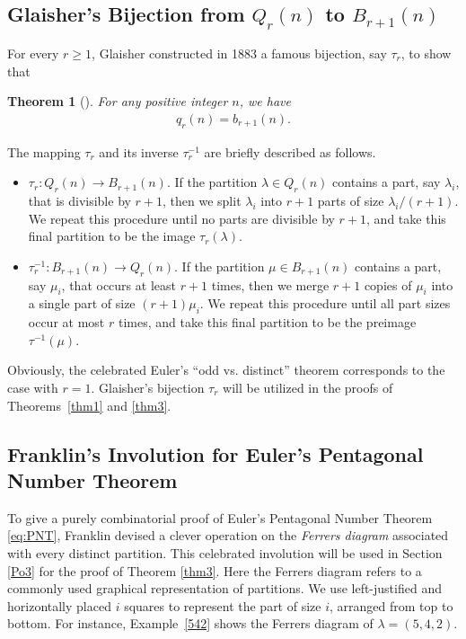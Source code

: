 \documentclass[12pt,reqno]{amsart}
\newtheorem{Theorem}{Theorem}[section]
\numberwithin{equation}{section}
\begin{document}
\subsection{Glaisher's Bijection from \texorpdfstring{$Q_{r}(n)$ to $B_{r+1}(n)$}{Qr(n) to Br+1(n)}\label{Gla}}
For every $r\ge 1$, Glaisher constructed in 1883 a famous bijection, say $\tau_r$, to show that
\begin{Theorem}[{\cite{glaisher1883}}]\label{thm:Glaisher}
	For any positive integer $n$, we have
	\begin{align*}
		q_{r}(n) = b_{r+1}(n).
	\end{align*}
\end{Theorem}
The mapping $\tau_r$ and its inverse $\tau^{-1}_r$ are briefly described as follows.
\begin{itemize}
	\item $\tau_r: Q_{r}(n) \to B_{r+1}(n)$. If the partition $\lambda\in Q_r(n)$ contains a part, say $\lambda_i$, that is divisible by $r+1$, then we split $\lambda_i$ into $r+1$ parts of size $\lambda_i/(r+1)$. We repeat this procedure until no parts are divisible by $r+1$, and take this final partition to be the image $\tau_r(\lambda)$.
	\item $\tau^{-1}_r: B_{r+1}(n)\to Q_{r}(n)$. If the partition $\mu\in B_{r+1}(n)$ contains a part, say $\mu_i$, that occurs at least $r+1$ times, then we merge $r+1$ copies of $\mu_i$ into a single part of size $(r+1)\mu_i$. We repeat this procedure until all part sizes occur at most $r$ times, and take this final partition to be the preimage $\tau^{-1}(\mu)$.
\end{itemize}

Obviously, the celebrated Euler's ``odd vs. distinct'' theorem corresponds to the case with $r = 1$. Glaisher's bijection $\tau_r$ will be utilized in the proofs of Theorems~\ref{thm1} and \ref{thm3}.

\subsection{Franklin's Involution for Euler's Pentagonal Number Theorem\label{EPT}}
To give a purely combinatorial proof of Euler's Pentagonal Number Theorem \eqref{eq:PNT}, Franklin devised a clever operation on the \emph{Ferrers diagram} associated with every distinct partition. This celebrated involution will be used in Section \ref{Po3} for the proof of Theorem \ref{thm3}. Here the Ferrers diagram refers to a commonly used graphical representation of partitions. We use left-justified and horizontally placed $i$ squares to represent the part of size $i$, arranged from top to bottom. For instance, Example~\ref{542} shows the Ferrers diagram of $\lambda=(5,4,2)$.
\end{document}
